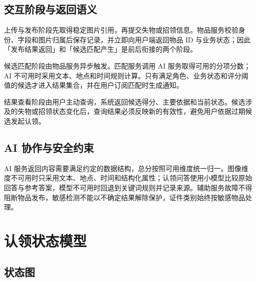 \subsection{交互阶段与返回语义}

上传与发布阶段先取得稳定图片引用，再提交失物或招领信息。物品服务校验身份、字段和图片归属后保存记录，并立即向用户端返回物品 ID 与业务状态；因此「发布结果返回」和「候选匹配产生」是前后衔接的两个阶段。

候选匹配阶段由物品服务异步触发。匹配服务调用 AI 服务取得可用的分项分数；AI 不可用时采用文本、地点和时间规则计算。只有满足角色、业务状态和评分阈值的候选才进入结果集合，并在用户订阅匹配时生成通知。

结果查看阶段由用户主动查询，系统返回候选得分、主要依据和当前状态。候选涉及的失物或招领状态变化后，查询结果必须反映新的有效性，避免用户依据过期候选发起认领。

\subsection{AI 协作与安全约束}

AI 服务返回内容需要满足约定的数据结构，总分按照可用维度统一归一。图像维度不可用时只采用文本、地点、时间和结构化属性；认领问答使用小模型比较原始回答与参考答案，模型不可用时回退到关键词规则并记录来源。辅助服务故障不得阻断物品发布，敏感检测不能以不确定结果解除保护，证件类别始终按敏感物品处理。

\clearpage
\section{认领状态模型}

\subsection{状态图}


